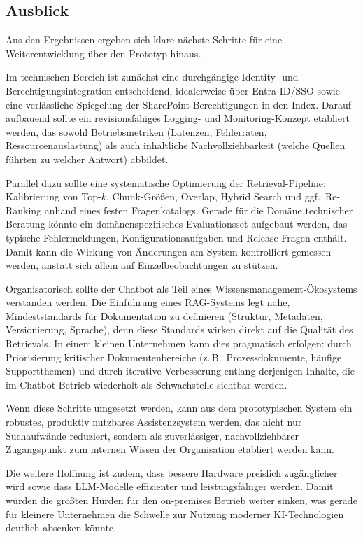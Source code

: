 \subsection{Ausblick}\label{subsec:ausblick}

Aus den Ergebnissen ergeben sich klare nächste Schritte für eine Weiterentwicklung über den Prototyp hinaus.

Im technischen Bereich ist zunächst eine durchgängige Identity- und Berechtigungsintegration entscheidend, idealerweise über Entra ID/SSO sowie eine verlässliche Spiegelung der SharePoint-Berechtigungen in den Index.
Darauf aufbauend sollte ein revisionsfähiges Logging- und Monitoring-Konzept etabliert werden, das sowohl Betriebsmetriken (Latenzen, Fehlerraten, Ressourcenauslastung) als auch inhaltliche Nachvollziehbarkeit (welche Quellen führten zu welcher Antwort) abbildet.

Parallel dazu sollte eine systematische Optimierung der Retrieval-Pipeline: Kalibrierung von Top-$k$, Chunk-Größen, Overlap, Hybrid Search und ggf.\ Re-Ranking anhand eines festen Fragenkatalogs.
Gerade für die Domäne technischer Beratung könnte ein domänenspezifisches Evaluationsset aufgebaut werden, das typische Fehlermeldungen, Konfigurationsaufgaben und Release-Fragen enthält.
Damit kann die Wirkung von Änderungen am System kontrolliert gemessen werden, anstatt sich allein auf Einzelbeobachtungen zu stützen.

Organisatorisch sollte der Chatbot als Teil eines Wissensmanagement-Ökosystems verstanden werden.
Die Einführung eines RAG-Systems legt nahe, Mindeststandards für Dokumentation zu definieren (Struktur, Metadaten, Versionierung, Sprache), denn diese Standards wirken direkt auf die Qualität des Retrievals.
In einem kleinen Unternehmen kann dies pragmatisch erfolgen: durch Priorisierung kritischer Dokumentenbereiche (z.\,B.\ Prozessdokumente, häufige Supportthemen) und durch iterative Verbesserung entlang derjenigen Inhalte, die im Chatbot-Betrieb wiederholt als Schwachstelle sichtbar werden.

Wenn diese Schritte umgesetzt werden, kann aus dem prototypischen System ein robustes, produktiv nutzbares Assistenzsystem werden, das nicht nur Suchaufwände reduziert, sondern als zuverlässiger, nachvollziehbarer Zugangspunkt zum internen Wissen der Organisation etabliert werden kann.

Die weitere Hoffnung ist zudem, dass bessere Hardware preislich zugänglicher wird sowie dass LLM-Modelle effizienter und leistungsfähiger werden.
Damit würden die größten Hürden für den on-premises Betrieb weiter sinken, was gerade für kleinere Unternehmen die Schwelle zur Nutzung moderner KI-Technologien deutlich absenken könnte.
